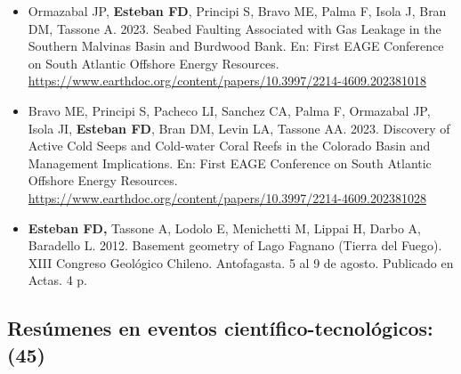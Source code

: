 \documentclass[11pt, a4paper]{article}
\begin{document}
\begin{itemize}
    \item Ormazabal JP, \textbf{Esteban FD}, Principi S, Bravo ME, Palma F, Isola J, Bran DM, Tassone A. 2023. Seabed Faulting Associated with Gas Leakage in the Southern Malvinas Basin and Burdwood Bank. En: First EAGE Conference on South Atlantic Offshore Energy Resources. \url{https://www.earthdoc.org/content/papers/10.3997/2214-4609.202381018}
    \item Bravo ME, Principi S, Pacheco LI, Sanchez CA, Palma F, Ormazabal JP, Isola JI, \textbf{Esteban FD}, Bran DM, Levin LA, Tassone AA. 2023. Discovery of Active Cold Seeps and Cold-water Coral Reefs in the Colorado Basin and Management Implications. En: First EAGE Conference on South Atlantic Offshore Energy Resources. \url{https://www.earthdoc.org/content/papers/10.3997/2214-4609.202381028}
    \item \textbf{Esteban FD,} Tassone A, Lodolo E, Menichetti M, Lippai H, Darbo A, Baradello L. 2012. Basement geometry of Lago Fagnano (Tierra del Fuego). XIII Congreso Geológico Chileno. Antofagasta. 5 al 9 de agosto. Publicado en Actas. 4 p.
\end{itemize}


\subsection{Resúmenes en eventos científico-tecnológicos: (45)}
\end{document}
